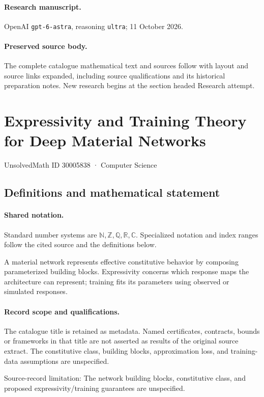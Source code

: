 \documentclass[11pt]{article}
\begin{document}
\paragraph{Research manuscript.} OpenAI \texttt{gpt-6-astra}, reasoning \texttt{ultra}; 11 October 2026.
\paragraph{Preserved source body.} The complete catalogue mathematical text and sources follow with layout and source links expanded, including source qualifications and its historical preparation notes. New research begins at the section headed Research attempt.

\section{Expressivity and Training Theory for Deep Material Networks}\label{30005838}
{\small UnsolvedMath ID 30005838 · Computer Science}
\subsection{Definitions and mathematical statement}

\paragraph{Shared notation.}Standard number systems are $\mathbb N,\mathbb Z,\mathbb Q,\mathbb R,\mathbb C$. Specialized notation and index ranges follow the cited source and the definitions below.


A material network represents effective constitutive behavior by composing parameterized building blocks. Expressivity concerns which response maps the architecture can represent; training fits its parameters using observed or simulated responses.
\paragraph{Record scope and qualifications.}
The catalogue title is retained as metadata. Named certificates, contracts, bounds or frameworks in that title are not asserted as results of the original source extract.
The constitutive class, building blocks, approximation loss, and training-data assumptions are unspecified.

Source-record limitation: The network building blocks, constitutive class, and proposed expressivity/training guarantees are unspecified.
\end{document}

